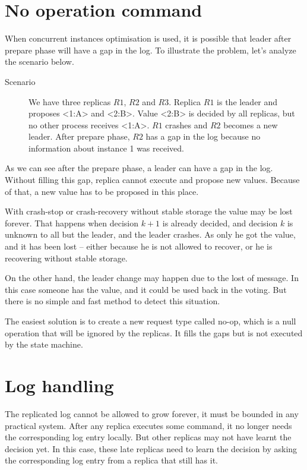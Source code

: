 \section{No operation command}

When concurrent instances optimisation is used, it is possible that leader after prepare phase will have a gap in the log. To illustrate the problem, let's analyze the scenario below.

\begin{description}
  \item [Scenario] We have three replicas $R1$, $R2$ and $R3$. Replica $R1$ is the leader and proposes <1:A> and <2:B>. Value <2:B> is decided by all replicas, but no other process receives <1:A>. $R1$ crashes and $R2$ becomes a new leader. After prepare phase, $R2$ has a gap in the log because no information about instance 1 was received.
\end{description} 

As we can see after the prepare phase, a leader can have a gap in the log. Without filling this gap, replica cannot execute and propose new values. Because of that, a new value has to be proposed in this place.

With crash-stop or crash-recovery without stable storage the value may be lost forever. That happens when decision $k+1$ is already decided, and decision $k$ is unknown to all but the leader, and the leader crashes. As only he got the value, and it has been lost -- either because he is not allowed to recover, or he is recovering without stable storage.

On the other hand, the leader change may happen due to the lost of \alive message. In this case someone has the value, and it could be used back in the voting. But there is no simple and fast method to detect this situation.

The easiest solution is to create a new request type called no-op, which is a null operation that will be ignored by the replicas. It fills the gaps but is not executed by the state machine.

\section{Log handling}

The replicated log cannot be allowed to grow forever, it must be bounded in any practical system. After any replica executes some command, it no longer needs the corresponding log entry locally. But other replicas may not have learnt the decision yet. In this case, these late replicas need to learn the decision by asking the corresponding log entry from a replica that still has it.

